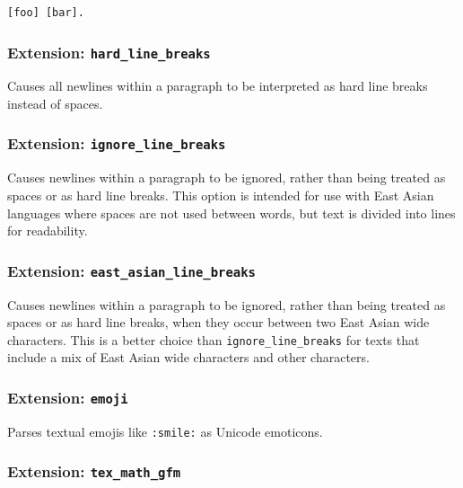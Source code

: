 \documentclass[
]{article}
\begin{document}
\begin{verbatim}
[foo] [bar].
\end{verbatim}

\hypertarget{extension-hard_line_breaks}{%
\subsubsection{\texorpdfstring{Extension:
\texttt{hard\_line\_breaks}}{Extension: hard\_line\_breaks}}\label{extension-hard_line_breaks}}

Causes all newlines within a paragraph to be interpreted as hard line
breaks instead of spaces.

\hypertarget{extension-ignore_line_breaks}{%
\subsubsection{\texorpdfstring{Extension:
\texttt{ignore\_line\_breaks}}{Extension: ignore\_line\_breaks}}\label{extension-ignore_line_breaks}}

Causes newlines within a paragraph to be ignored, rather than being
treated as spaces or as hard line breaks. This option is intended for
use with East Asian languages where spaces are not used between words,
but text is divided into lines for readability.

\hypertarget{extension-east_asian_line_breaks}{%
\subsubsection{\texorpdfstring{Extension:
\texttt{east\_asian\_line\_breaks}}{Extension: east\_asian\_line\_breaks}}\label{extension-east_asian_line_breaks}}

Causes newlines within a paragraph to be ignored, rather than being
treated as spaces or as hard line breaks, when they occur between two
East Asian wide characters. This is a better choice than
\texttt{ignore\_line\_breaks} for texts that include a mix of East Asian
wide characters and other characters.

\hypertarget{extension-emoji}{%
\subsubsection{\texorpdfstring{Extension:
\texttt{emoji}}{Extension: emoji}}\label{extension-emoji}}

Parses textual emojis like \texttt{:smile:} as Unicode emoticons.

\hypertarget{extension-tex_math_gfm}{%
\subsubsection{\texorpdfstring{Extension:
\texttt{tex\_math\_gfm}}{Extension: tex\_math\_gfm}}\label{extension-tex_math_gfm}}
\end{document}
